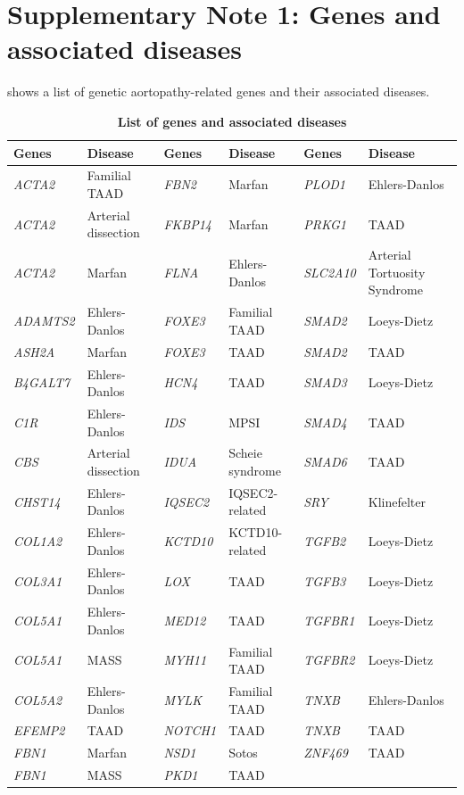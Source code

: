 \documentclass[fleqn,10pt]{wlscirep}
\begin{document}
\section*{Supplementary Note 1: Genes and associated diseases}
 shows a list of genetic aortopathy-related genes and their associated diseases. 
\begin{table}[h]
    \centering
    \renewcommand{\arraystretch}{1.2} %
    \begin{tabular}{l l | l l | l l}
        \toprule
        \textbf{Genes} & \textbf{Disease} & \textbf{Genes} & \textbf{Disease} & \textbf{Genes} & \textbf{Disease} \\
        \midrule
        \textit{ACTA2} & Familial TAAD & \textit{FBN2} & Marfan & \textit{PLOD1} & Ehlers-Danlos \\
        \textit{ACTA2} & Arterial dissection & \textit{FKBP14} & Marfan & \textit{PRKG1} & TAAD \\
        \textit{ACTA2} & Marfan & \textit{FLNA} & Ehlers-Danlos & \textit{SLC2A10} & Arterial Tortuosity Syndrome \\
        \textit{ADAMTS2} & Ehlers-Danlos & \textit{FOXE3} & Familial TAAD & \textit{SMAD2} & Loeys-Dietz \\
        \textit{ASH2A} & Marfan & \textit{FOXE3} & TAAD & \textit{SMAD2} & TAAD \\
        \textit{B4GALT7} & Ehlers-Danlos & \textit{HCN4} & TAAD & \textit{SMAD3} & Loeys-Dietz \\
        \textit{C1R} & Ehlers-Danlos & \textit{IDS} & MPSI & \textit{SMAD4} & TAAD \\
        \textit{CBS} & Arterial dissection & \textit{IDUA} & Scheie syndrome & \textit{SMAD6} & TAAD \\
        \textit{CHST14} & Ehlers-Danlos & \textit{IQSEC2} & IQSEC2-related & \textit{SRY} & Klinefelter \\
        \textit{COL1A2} & Ehlers-Danlos & \textit{KCTD10} & KCTD10-related & \textit{TGFB2} & Loeys-Dietz \\
        \textit{COL3A1} & Ehlers-Danlos & \textit{LOX} & TAAD & \textit{TGFB3} & Loeys-Dietz \\
        \textit{COL5A1} & Ehlers-Danlos & \textit{MED12} & TAAD & \textit{TGFBR1} & Loeys-Dietz \\
        \textit{COL5A1} & MASS & \textit{MYH11} & Familial TAAD & \textit{TGFBR2} & Loeys-Dietz \\
        \textit{COL5A2} & Ehlers-Danlos & \textit{MYLK} & Familial TAAD & \textit{TNXB} & Ehlers-Danlos \\
        \textit{EFEMP2} & TAAD & \textit{NOTCH1} & TAAD & \textit{TNXB} & TAAD \\
        \textit{FBN1} & Marfan & \textit{NSD1} & Sotos & \textit{ZNF469} & TAAD \\
        \textit{FBN1} & MASS & \textit{PKD1} & TAAD & & \\
        \bottomrule
    \end{tabular}
    \caption{\textbf{List of genes and associated diseases}}
    \label{tab:genes_diseases}
\end{table}
\end{document}
